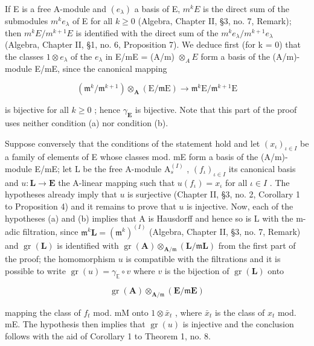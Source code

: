 If E is a free A-module and \((e_{\lambda})\) a basis of E, \(m^{k}E\) is the direct sum of the submodules \(m^{k}e_{\lambda}\) of E for all \(k \geqslant 0\) (Algebra, Chapter II, §3, no. 7, Remark); then \(m^{k}E/m^{k+1}E\) is identified with the direct sum of the \(m^{k}e_{\lambda}/m^{k+1}e_{\lambda}\) (Algebra, Chapter II, §1, no. 6, Proposition 7). We deduce first (for k = 0) that the classes \(1 \otimes e_{\lambda}\) of the \(e_{\lambda}\) in E/mE = (A/m) \(\otimes_{A} E\) form a basis of the (A/m)-module E/mE, since the canonical mapping

\[
\left(\mathfrak {m} ^ {k} / \mathfrak {m} ^ {k + 1}\right) \otimes_ {\mathbf {A}} (\mathrm{E} / \mathfrak {m} \mathrm{E}) \rightarrow \mathfrak {m} ^ {k} \mathrm{E} / \mathfrak {m} ^ {k + 1} \mathrm{E}
\]

is bijective for all \(k \geqslant 0\) ; hence \(\gamma_{\mathbf{E}}\) is bijective. Note that this part of the proof uses neither condition (a) nor condition (b).

Suppose conversely that the conditions of the statement hold and let \((x_{\iota})_{\iota \in I}\) be a family of elements of E whose classes mod. mE form a basis of the (A/m)-module E/mE; let L be the free A-module \(\mathrm{A}_s^{(I)}\) , \((f_{\iota})_{\iota \in I}\) its canonical basis and \(u: \mathbf{L} \to \mathbf{E}\) the A-linear mapping such that \(u(f_{\iota}) = x_{\iota}\) for all \(\iota \in I\) . The hypotheses already imply that \(u\) is surjective (Chapter II, §3, no. 2, Corollary 1 to Proposition 4) and it remains to prove that \(u\) is injective. Now, each of the hypotheses (a) and (b) implies that A is Hausdorff and hence so is L with the m-adic filtration, since \(\mathfrak{m}^k\mathbf{L} = (\mathfrak{m}^k)^{(I)}\) (Algebra, Chapter II, §3, no. 7, Remark) and \(\operatorname{gr}(\mathbf{L})\) is identified with \(\operatorname{gr}(\mathbf{A}) \otimes_{\mathbf{A} / \mathfrak{m}} (\mathbf{L} / \mathfrak{m}\mathbf{L})\) from the first part of the proof; the homomorphism \(u\) is compatible with the filtrations and it is possible to write \(\operatorname{gr}(u) = \gamma_{\mathbb{E}} \circ v\) where \(v\) is the bijection of \(\operatorname{gr}(\mathbf{L})\) onto

\[
\operatorname{gr} (\mathbf {A}) \otimes_ {\mathbf {A} / \mathfrak {m}} (\mathbf {E} / \mathfrak {m} \mathbf {E})
\]

mapping the class of \(f_{t}\) mod. mM onto \(1 \otimes \bar{x}_{t}\) , where \(\bar{x}_{t}\) is the class of \(x_{t}\) mod. mE. The hypothesis then implies that \(\operatorname{gr}(u)\) is injective and the conclusion follows with the aid of Corollary 1 to Theorem 1, no. 8.

